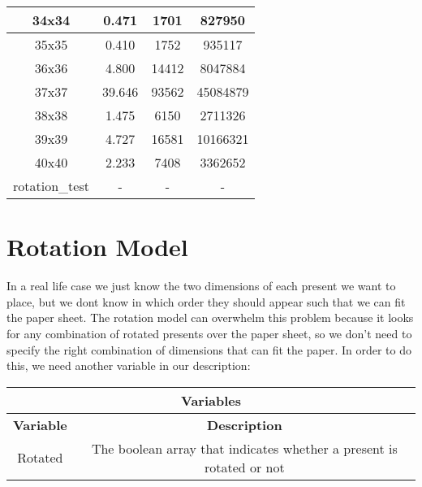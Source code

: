 \begin{center}
\begin{tabular}{|c|c|c|c|}
        34x34 & 0.471 & 1701 & 827950 \\ \hline
        35x35 & 0.410 & 1752 & 935117 \\ \hline
        36x36 & 4.800 & 14412 & 8047884 \\ \hline
        37x37 & 39.646 & 93562 & 45084879 \\ \hline
        38x38 & 1.475 & 6150 & 2711326 \\ \hline
        39x39 & 4.727 & 16581 & 10166321 \\ \hline
        40x40 & 2.233 & 7408 & 3362652 \\ \hline
        rotation\_test & - & - & - \\ \hline
    \end{tabular}
\end{center}


\section{Rotation Model}
In a real life case we just know the two dimensions of each present we want to place, but we dont know in which order they should appear such that we can fit the paper sheet.
The rotation model can overwhelm this problem because it looks for any combination of rotated presents over the paper sheet, so we don't need to specify the right combination
of dimensions that can fit the paper. In order to do this, we need another variable in our description:

\begin{center}
		\begin{tabular}{|c|c|}
			\hline
			\multicolumn{2}{|c|}{\textbf{Variables}} \\
			\hline
			\textbf{Variable} & {\textbf{Description}} \\
			\hline
			Rotated & The boolean array that indicates whether a present is rotated or not \\
			\hline
		\end{tabular}
\end{center}

